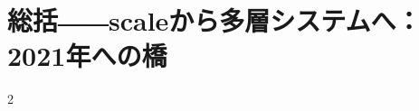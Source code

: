 \documentclass[lualatex,a4paper,11pt]{jlreq}
\begin{document}
\clearpage
\section{総括――scaleから多層システムへ：2021年への橋}
\label{pkg:synthesis-transition-2021}

\medskip
\begin{multicols}{2}

\end{multicols}


\clearpage
\printbibliography[title={References / Source Notes}]
\end{document}
